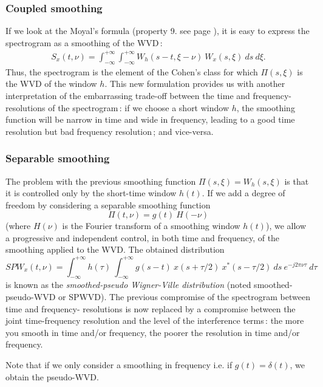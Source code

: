 \subsubsection{Coupled smoothing}

  If we look at the Moyal's formula (property 9. see page
\pageref{unitarity}), it is easy to express the spectrogram as a smoothing
of the WVD\,:
\begin{eqnarray}
\label{spectro}
S_x(t,\nu)=\int_{-\infty}^{+\infty}\int_{-\infty}^{+\infty}
W_h(s-t,\xi-\nu)\ W_x(s,\xi)\ ds\ d\xi.	 
\end{eqnarray}
Thus, the spectrogram is the element of the Cohen's class for which
$\Pi(s,\xi)$ is the WVD of the window $h$. This new formulation provides us
with another interpretation of the embarrassing trade-off between the time
and frequency- resolutions of the spectrogram\,: if we choose a short
window $h$, the smoothing function will be narrow in time and wide in
frequency, leading to a good time resolution but bad
frequency resolution\,; and vice-versa.

\subsubsection{Separable smoothing}
\label{SPWVD}
  The problem with the previous smoothing function $\Pi(s,\xi)=W_h(s,\xi)$
is that it is controlled only by the short-time window $h(t)$. If we add a
degree of freedom by considering a separable smoothing function
\[\Pi(t,\nu)=g(t)\ H(-\nu)\] (where $H(\nu)$ is the Fourier transform of a
smoothing window $h(t)$), we allow a progressive and independent control,
in both time and frequency, of the smoothing applied to the WVD. The
obtained distribution
\[SPW_x(t,\nu)=\int_{-\infty}^{+\infty} h(\tau)\ \int_{-\infty}^{+\infty}
g(s-t)\ x(s+\tau/2)\ x^*(s-\tau/2)\ ds\ e^{-j2\pi \nu \tau}\ d\tau\] is
known as the {\it smoothed-pseudo Wigner-Ville distribution} (noted
smoothed-pseudo-WVD or SPWVD). The previous compromise of the spectrogram
between time and frequency- resolutions is now replaced by a compromise
between the joint time-frequency resolution and the level of the
interference terms\,: the more you smooth in time and/or frequency, the
poorer the resolution in time and/or frequency.

Note that if we only consider a smoothing in frequency  i.e. if
$g(t)=\delta(t)$, we obtain the pseudo-WVD.\\

